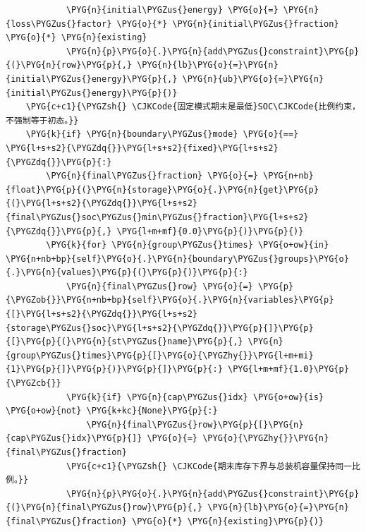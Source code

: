 \begin{Verbatim}
            \PYG{n}{initial\PYGZus{}energy} \PYG{o}{=} \PYG{n}{loss\PYGZus{}factor} \PYG{o}{*} \PYG{n}{initial\PYGZus{}fraction} \PYG{o}{*} \PYG{n}{existing}
            \PYG{n}{p}\PYG{o}{.}\PYG{n}{add\PYGZus{}constraint}\PYG{p}{(}\PYG{n}{row}\PYG{p}{,} \PYG{n}{lb}\PYG{o}{=}\PYG{n}{initial\PYGZus{}energy}\PYG{p}{,} \PYG{n}{ub}\PYG{o}{=}\PYG{n}{initial\PYGZus{}energy}\PYG{p}{)}
    \PYG{c+c1}{\PYGZsh{} \CJKCode{固定模式期末是最低}SOC\CJKCode{比例约束，不强制等于初态。}}
    \PYG{k}{if} \PYG{n}{boundary\PYGZus{}mode} \PYG{o}{==} \PYG{l+s+s2}{\PYGZdq{}}\PYG{l+s+s2}{fixed}\PYG{l+s+s2}{\PYGZdq{}}\PYG{p}{:}
        \PYG{n}{final\PYGZus{}fraction} \PYG{o}{=} \PYG{n+nb}{float}\PYG{p}{(}\PYG{n}{storage}\PYG{o}{.}\PYG{n}{get}\PYG{p}{(}\PYG{l+s+s2}{\PYGZdq{}}\PYG{l+s+s2}{final\PYGZus{}soc\PYGZus{}min\PYGZus{}fraction}\PYG{l+s+s2}{\PYGZdq{}}\PYG{p}{,} \PYG{l+m+mf}{0.0}\PYG{p}{)}\PYG{p}{)}
        \PYG{k}{for} \PYG{n}{group\PYGZus{}times} \PYG{o+ow}{in} \PYG{n+nb+bp}{self}\PYG{o}{.}\PYG{n}{boundary\PYGZus{}groups}\PYG{o}{.}\PYG{n}{values}\PYG{p}{(}\PYG{p}{)}\PYG{p}{:}
            \PYG{n}{final\PYGZus{}row} \PYG{o}{=} \PYG{p}{\PYGZob{}}\PYG{n+nb+bp}{self}\PYG{o}{.}\PYG{n}{variables}\PYG{p}{[}\PYG{l+s+s2}{\PYGZdq{}}\PYG{l+s+s2}{storage\PYGZus{}soc}\PYG{l+s+s2}{\PYGZdq{}}\PYG{p}{]}\PYG{p}{[}\PYG{p}{(}\PYG{n}{st\PYGZus{}name}\PYG{p}{,} \PYG{n}{group\PYGZus{}times}\PYG{p}{[}\PYG{o}{\PYGZhy{}}\PYG{l+m+mi}{1}\PYG{p}{]}\PYG{p}{)}\PYG{p}{]}\PYG{p}{:} \PYG{l+m+mf}{1.0}\PYG{p}{\PYGZcb{}}
            \PYG{k}{if} \PYG{n}{cap\PYGZus{}idx} \PYG{o+ow}{is} \PYG{o+ow}{not} \PYG{k+kc}{None}\PYG{p}{:}
                \PYG{n}{final\PYGZus{}row}\PYG{p}{[}\PYG{n}{cap\PYGZus{}idx}\PYG{p}{]} \PYG{o}{=} \PYG{o}{\PYGZhy{}}\PYG{n}{final\PYGZus{}fraction}
            \PYG{c+c1}{\PYGZsh{} \CJKCode{期末库存下界与总装机容量保持同一比例。}}
            \PYG{n}{p}\PYG{o}{.}\PYG{n}{add\PYGZus{}constraint}\PYG{p}{(}\PYG{n}{final\PYGZus{}row}\PYG{p}{,} \PYG{n}{lb}\PYG{o}{=}\PYG{n}{final\PYGZus{}fraction} \PYG{o}{*} \PYG{n}{existing}\PYG{p}{)}
\end{Verbatim}
